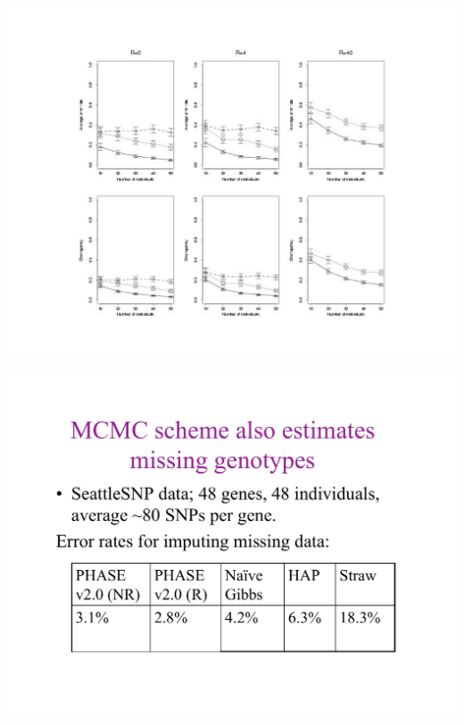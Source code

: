\newslide{}
\mbox{}
\vspace*{\VertUp}
\enlargethispage*{1000pt}
\begin{center}
\includegraphics*[width=\textwidth]{PPT_pages/pg_0045.pdf}
\end{center}


\newslide{}
\mbox{}
\vspace*{\VertUp}
\enlargethispage*{1000pt}
\begin{center}
\includegraphics*[width=\textwidth]{PPT_pages/pg_0046.pdf}
\end{center}


